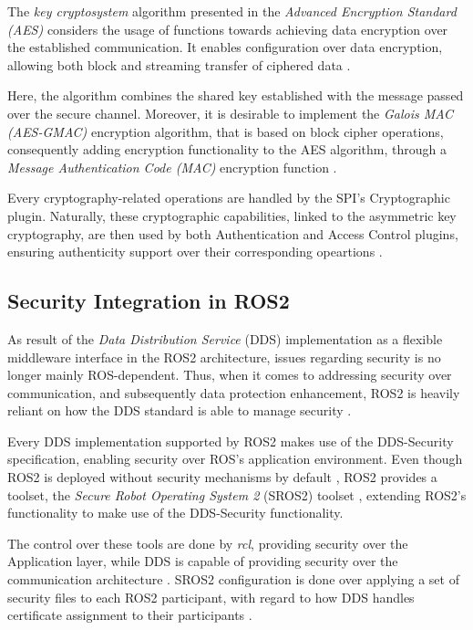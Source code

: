 The \textit{key cryptosystem} algorithm \cite{takemoto2019performance} presented in the \textit{Advanced Encryption Standard (AES)} considers the usage of functions towards achieving data encryption over the established communication. It enables configuration over data encryption, allowing both block and streaming transfer of ciphered data \cite{diluoffo2018robot}.

Here, the algorithm combines the shared key established with the message passed over the secure channel. Moreover, it is desirable to implement the \textit{Galois MAC (AES-GMAC)} encryption algorithm, that is based on block cipher operations, consequently adding encryption functionality to the AES algorithm, through a \textit{Message Authentication Code (MAC)} encryption function \cite{takemoto2019performance, kim2018security}.

Every cryptography-related operations are handled by the SPI's Cryptographic plugin. Naturally, these cryptographic capabilities, linked to the asymmetric key cryptography, are then used by both Authentication and Access Control plugins, ensuring authenticity support over their corresponding opeartions \cite{ros-dds-integration, diluoffo2018robot}.

\subsection{Security Integration in ROS2}

As result of the \textit{Data Distribution Service} (DDS) implementation as a flexible middleware interface in the ROS2 architecture, issues regarding security is no longer mainly ROS-dependent. Thus, when it comes to addressing security over communication, and subsequently data protection enhancement, ROS2 is heavily reliant on how the DDS standard is able to manage security \cite{kim2018security, 8794451}.

Every DDS implementation supported by ROS2 makes use of the DDS-Security specification, enabling security over ROS's application environment. Even though ROS2 is deployed without security mechanisms by default \cite{ros-dds-integration}, ROS2 provides a toolset, the \textit{Secure Robot Operating System 2} (SROS2) toolset \cite{sros2-gh}, extending ROS2's functionality to make use of the DDS-Security functionality. 

The control over these tools are done by \textit{rcl}, providing security over the Application layer, while DDS is capable of providing security over the communication architecture \cite{kim2018security}. SROS2 configuration is done over applying a set of security files to each ROS2 participant, with regard to how DDS handles certificate assignment to their participants \cite{white2016sros, ros-dds-integration}. 

